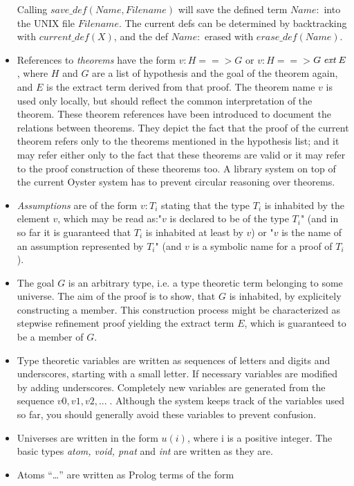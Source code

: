 \documentclass[11pt]{report}
\begin{document}
\begin{itemize}
 Calling $save\_def( Name, Filename )$ will save the defined term $Name:  $
 into the UNIX file $Filename$.
 The current defs can be determined by backtracking with 
 $current\_def(X)$, and the def $Name:  $ erased with $erase\_def(Name)$.
 \item
 References to \emph{theorems} have the form 
 $v:H$$==>$$G$ or $v:H$$==>$$G\; \mbox{\it ext} \; E$ , where
 $H$ and $G$ are a list of hypothesis and the goal of the
 theorem again, and $E$ is the extract term derived from that
 proof. The theorem name $v$ is used only locally, but should reflect
 the common interpretation of the theorem.
 These theorem references have been introduced to document the
 relations between theorems. 
 They depict the fact that the proof of the current theorem 
 refers only to the theorems mentioned in the hypothesis list;
 and it may refer either only to the fact that these theorems are
 valid or it may refer to the proof construction of these theorems too.
 A library system on top of the current Oyster system has
 to prevent circular reasoning over theorems.
 \item
 \emph{Assumptions} are of the form 
 $v:T_i$ stating that the type $T_i$
 is inhabited by the element $v$, which may be read as:"$v$ is 
 declared to be of the type $T_i$" (and in so far it is guaranteed
 that $T_i$ is inhabited at least by $v$) or "$v$ is the name of an
 assumption represented by $T_i$" (and $v$ is a symbolic name for
 a proof of $T_i$). 
 \item
 The goal $G$ is an arbitrary type, i.e. a type
 theoretic term belonging to some
 universe. The aim of the proof is to show, that $G$ is inhabited,
 by explicitely constructing a member. This construction process
 might be characterized as stepwise refinement proof yielding
 the extract term $E$, which is guaranteed to be a member of $G$.
 \item
 Type theoretic variables are written as sequences of
 letters and digits and underscores, starting with a small letter.
 If necessary variables are modified by adding underscores.
 Completely new variables are generated from the sequence 
 $v0, v1, v2,...\;$. Although the system keeps track of the
 variables used so far, you should generally avoid these variables
 to prevent confusion.
 \item
 Universes are written in the form  $u(i)$, where i is a
 positive integer.
 The basic types \emph{atom, void, pnat} and \emph{int} are
 written as they are.
 \item
 Atoms ``\dots'' are written as Prolog terms of the form 

\end{itemize}
\end{document}

